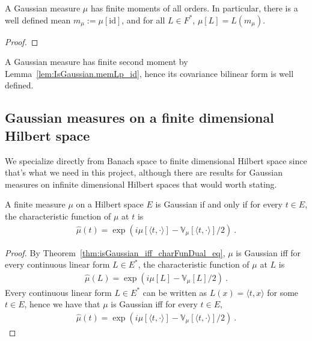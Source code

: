 \begin{lemma}\label{lem:IsGaussian.memLp_id}
  \mathlibok
A Gaussian measure $\mu$ has finite moments of all orders.
In particular, there is a well defined mean $m_\mu := \mu[\mathrm{id}]$, and for all $L \in F^*$, $\mu[L] = L(m_\mu)$.
\end{lemma}

\begin{proof}\leanok

\end{proof}

A Gaussian measure has finite second moment by Lemma~\ref{lem:IsGaussian.memLp_id}, hence its covariance bilinear form is well defined.


\subsection{Gaussian measures on a finite dimensional Hilbert space}

We specialize directly from Banach space to finite dimensional Hilbert space since that's what we need in this project, although there are results for Gaussian measures on infinite dimensional Hilbert spaces that would worth stating.

\begin{lemma}\label{lem:isGaussian_iff_charFun_eq}
  \mathlibok
A finite measure $\mu$ on a Hilbert space $E$ is Gaussian if and only if for every $t \in E$, the characteristic function of $\mu$ at $t$ is
\begin{align*}
  \hat{\mu}(t) =  \exp\left(i \mu[\langle t, \cdot \rangle] - \mathbb{V}_\mu[\langle t, \cdot \rangle] / 2\right) \: .
\end{align*}
\end{lemma}

\begin{proof}\mathlibok
By Theorem~\ref{thm:isGaussian_iff_charFunDual_eq}, $\mu$ is Gaussian iff for every continuous linear form $L \in E^*$, the characteristic function of $\mu$ at $L$ is
\begin{align*}
  \hat{\mu}(L) = \exp\left(i \mu[L] - \mathbb{V}_\mu[L] / 2\right) \: .
\end{align*}
Every continuous linear form $L \in E^*$ can be written as $L(x) = \langle t, x \rangle$ for some $t \in E$, hence we have that $\mu$ is Gaussian iff for every $t \in E$,
\begin{align*}
  \hat{\mu}(t) = \exp\left(i \mu[\langle t, \cdot \rangle] - \mathbb{V}_\mu[\langle t, \cdot \rangle] / 2\right) \: .
\end{align*}
\end{proof}

